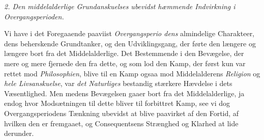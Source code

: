 \divrule

\emph{2. Den middelalderlige Grundanskuelses ubevidst
hæmmende Indvirkning i Overgangsperioden.}

Vi have i det Foregaaende paaviist \emph{Overgangsperio\-%
dens} almindelige Charakteer, dens beherskende Grundtanker,
og den Udviklingsgang, der førte den længere og længere bort
fra det Middelalderlige. Det Bestemmende i den Bevægelse,
der mere og mere fjernede den fra dette, og som lod den
Kamp, der først kun var rettet mod \emph{Philosophien}, blive
til en Kamp ogsaa mod Middelalderens \emph{Religion} og \emph{hele
Livsanskuelse}, var \emph{det Naturliges} bestandig stærkere
Hævdelse i dets Væsentlighed. Men medens Bevægelsen gaaer
bort fra det Middelalderlige, ja endog hvor Modsætningen til
dette bliver til forbittret Kamp, see vi dog Overgangsperiodens
Tænkning ubevidst at blive paavirket af den Fortid, af hvilken
den er fremgaaet, og Consequentsens Strænghed og Klarhed
at lide derunder.

